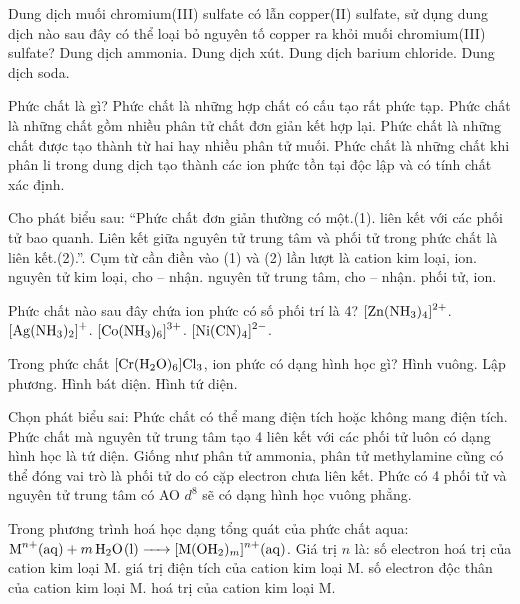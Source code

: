 \documentclass[11pt,a4paper]{article}
\begin{document}
\begin{ex}
 Dung dịch muối chromium(III) sulfate có lẫn copper(II) sulfate, sử dụng dung dịch nào sau đây có thể loại bỏ nguyên tố copper ra khỏi muối chromium(III) sulfate?
\choice
{Dung dịch ammonia.}
{Dung dịch xút.}
{Dung dịch barium chloride.}
{Dung dịch soda.}
\loigiai{}
\end{ex}

\begin{ex}
Phức chất là gì?
\choice
{Phức chất là những hợp chất có cấu tạo rất phức tạp.}
{Phức chất là những chất gồm nhiều phân tử chất đơn giản kết hợp lại.}
{Phức chất là những chất được tạo thành từ hai hay nhiều phân tử muối.}
{Phức chất là những chất khi phân li trong dung dịch tạo thành các ion phức tồn tại độc lập và có tính chất xác định.}
\loigiai{}
\end{ex}

\begin{ex}
Cho phát biểu sau: “Phức chất đơn giản thường có một.(1). liên kết với các phối tử bao quanh. Liên kết giữa nguyên tử trung tâm và phối tử trong phức chất là liên kết.(2).”. Cụm từ cần điền vào (1) và (2) lần lượt là
\choice
{cation kim loại, ion.}
{nguyên tử kim loại, cho -- nhận.}
{nguyên tử trung tâm, cho -- nhận.}
{phối tử, ion.}
\loigiai{}
\end{ex}

\begin{ex}
Phức chất nào sau đây chứa ion phức có số phối trí là 4?
\choice
{$\ce{[Zn(NH3)4]^2+}$.}
{$\ce{[Ag(NH3)2]+}$.}
{$\ce{[Co(NH3)6]^3+}$.}
{$\ce{[Ni(CN)4]^2-}$.}
\loigiai{}
\end{ex}

\begin{ex}
Trong phức chất $\ce{[Cr(H2O)6]Cl3}$, ion phức có dạng hình học gì?
\choice
{Hình vuông.}
{Lập phương.}
{Hình bát diện.}
{Hình tứ diện.}
\loigiai{}
\end{ex}

\begin{ex}
Chọn phát biểu sai:
\choice
{Phức chất có thể mang điện tích hoặc không mang điện tích.}
{Phức chất mà nguyên tử trung tâm tạo 4 liên kết với các phối tử luôn có dạng hình học là tứ diện.}
{Giống như phân tử ammonia, phân tử methylamine cũng có thể đóng vai trò là phối tử do có cặp electron chưa liên kết.}
{Phức có 4 phối tử và nguyên tử trung tâm có AO $d^8$ sẽ có dạng hình học vuông phẳng.}
\loigiai{}
\end{ex}

\newpage

\begin{ex}
Trong phương trình hoá học dạng tổng quát của phức chất aqua: $\ce{M^{n+}(aq) + m H2O(l) -> [M(OH2)_m]^{n+}(aq)}$. Giá trị $n$ là:
\choice
{số electron hoá trị của cation kim loại M.}
{giá trị điện tích của cation kim loại M.}
{số electron độc thân của cation kim loại M.}
{hoá trị của cation kim loại M.}
\loigiai{}
\end{ex}
\end{document}
